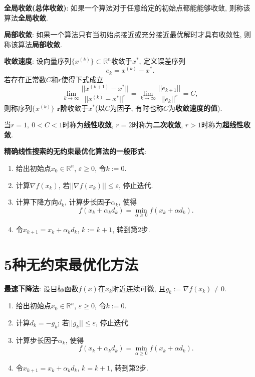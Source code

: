 \documentclass[12pt, a4paper, oneside]{ctexart}
\let\leq=\leqslant %
\let\geq=\geqslant %
\def\bd{\boldsymbol}        %
\def\R{\mathbb{R}}          %
\begin{document}
\textbf{全局收敛(总体收敛)}: 如果一个算法对于任意给定的初始点都能能够收敛, 则称该算法\textbf{全局收敛}.

\textbf{局部收敛}: 如果一个算法只有当初始点接近或充分接近最优解时才具有收敛性, 则称该算法\textbf{局部收敛}.

\textbf{收敛速度}: 设向量序列$\{x^{(k)}\}\subset \R^n$收敛于$x^*$, 定义误差序列
\begin{equation*}
    e_k = x^{(k)} - x^*.
\end{equation*}
若存在正常数$C$和$r$使得下式成立
\begin{equation*}
    \lim_{k\to\infty}\frac{||x^{(k+1)}-x^*||}{||x^{(k)}-x^*||^r}=\lim_{k\to\infty}\frac{||e_{k+1}||}{||e_k||^r} = C,
\end{equation*}
则称序列$\{x^{(k)}\}$ $\bd{r}$\textbf{阶}收敛于$x^*$(以$C$为因子, 有时也称$C$为\textbf{收敛速度的值}).

当$r=1,\ 0 < C < 1$时称为\textbf{线性收敛}, $r=2$时称为\textbf{二次收敛}, $r > 1$时称为\textbf{超线性收敛}.

\textbf{精确线性搜索的无约束最优化算法的一般形式}:
\begin{enumerate}
    \item 给出初始点$x_0\in\R^n$, $\varepsilon \geq 0$, 令$k:=0$.

    \item 计算$\nabla f(x_k)$, 若$||\nabla f(x_k)||\leq \varepsilon$, 停止迭代.

    \item 计算下降方向$d_k$, 计算步长因子$\alpha_k$, 使得
    \begin{equation*}
        f(x_k+\alpha_kd_k) = \min_{\alpha \geq 0} f(x_k+\alpha d_k).
    \end{equation*}

    \item 令$x_{k+1} = x_k+\alpha_kd_k$, $k:=k+1$, 转到第2步.
\end{enumerate}

\section*{5种无约束最优化方法}

\textbf{最速下降法}: 设目标函数$f(x)$在$x_k$附近连续可微, 且$g_k:= \nabla f(x_k)\neq 0$.
\begin{enumerate}
    \item 给出初始点$x_0\in\R^n$, $\varepsilon\geq 0$, 令$k:= 0$.
    \item 计算$d_k = -g_k$; 若$||g_k|| \leq \varepsilon$, 停止迭代.
    \item 计算步长因子$\alpha_k$, 使得
    \begin{equation*}
        f(x_k+\alpha_kd_k) = \min_{\alpha \geq 0} f(x_k+\alpha d_k).
    \end{equation*}
    \item 令$x_{k+1} = x_k+\alpha_kd_k$, $k = k+1$, 转到第2步.
\end{enumerate}
\end{document}
